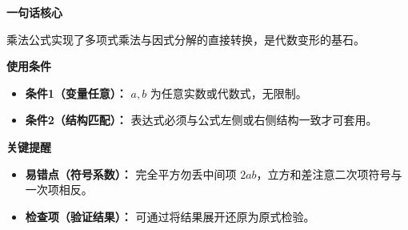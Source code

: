\begin{summarybox}
	\textbf{\textcolor{CSummary}{一句话核心}}

	乘法公式实现了多项式乘法与因式分解的直接转换，是代数变形的基石。

	\medskip
	\textbf{\textcolor{CSummary}{使用条件}}
	\begin{itemize}[leftmargin=*, itemsep=0.5em, topsep=0.4em]
		\item \textbf{条件1（变量任意）：} $a,b$ 为任意实数或代数式，无限制。
		\item \textbf{条件2（结构匹配）：} 表达式必须与公式左侧或右侧结构一致才可套用。
	\end{itemize}

	\medskip
	\textbf{\textcolor{CSummary}{关键提醒}}
	\begin{itemize}[leftmargin=*, itemsep=0.5em, topsep=0.4em]
		\item \textbf{易错点（符号系数）：} 完全平方勿丢中间项 $2ab$，立方和差注意二次项符号与一次项相反。
		\item \textbf{检查项（验证结果）：} 可通过将结果展开还原为原式检验。
	\end{itemize}
\end{summarybox}
